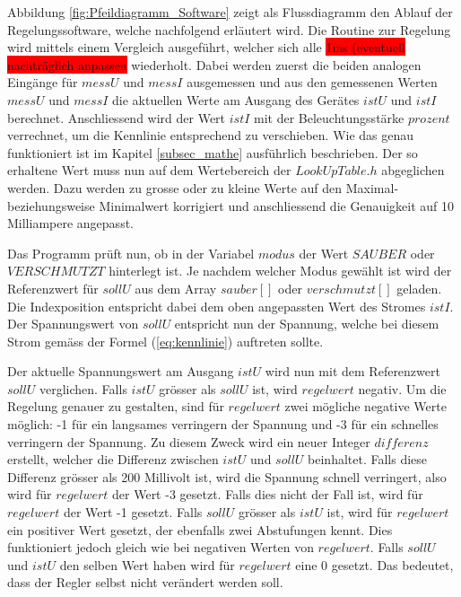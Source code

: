 Abbildung \ref{fig:Pfeildiagramm_Software} zeigt als Flussdiagramm den Ablauf der Regelungssoftware, welche nachfolgend erläutert wird. Die Routine zur Regelung wird mittels einem Vergleich ausgeführt, welcher sich alle \colorbox{red}{1ms (eventuell nachträglich anpassen} wiederholt. Dabei werden zuerst die beiden analogen Eingänge für $messU$ und $messI$ ausgemessen und aus den gemessenen Werten $messU$ und $messI$ die aktuellen Werte am Ausgang des Gerätes $istU$ und $istI$ berechnet. \newline
Anschliessend wird der Wert $istI$ mit der Beleuchtungsstärke $prozent$ verrechnet, um die Kennlinie entsprechend zu verschieben. Wie das genau funktioniert ist im Kapitel \ref{subsec_mathe} ausführlich beschrieben. \newline
Der so erhaltene Wert muss nun auf dem Wertebereich der $LookUpTable.h$ abgeglichen werden. Dazu werden zu grosse oder zu kleine Werte auf den Maximal- beziehungsweise Minimalwert korrigiert und anschliessend die Genauigkeit auf 10 Milliampere angepasst.

Das Programm prüft nun, ob in der Variabel $modus$ der Wert $SAUBER$ oder $VERSCHMUTZT$ hinterlegt ist. Je nachdem welcher Modus gewählt ist wird der Referenzwert für $sollU$ aus dem Array $sauber[]$ oder $verschmutzt[]$ geladen. Die Indexposition entspricht dabei dem oben angepassten Wert des Stromes $istI$. Der Spannungswert von $sollU$ entspricht nun der Spannung, welche bei diesem Strom gemäss der Formel (\ref{eq:kennlinie}) auftreten sollte.

Der aktuelle Spannungswert am Ausgang $istU$ wird nun mit dem Referenzwert $sollU$ verglichen. Falls $istU$ grösser als $sollU$ ist, wird $regelwert$ negativ. Um die Regelung genauer zu gestalten, sind für $regelwert$ zwei mögliche negative Werte möglich: -1 für ein langsames verringern der Spannung und -3 für ein schnelles verringern der Spannung. Zu diesem Zweck wird ein neuer Integer $differenz$ erstellt, welcher die Differenz zwischen $istU$ und $sollU$ beinhaltet. Falls diese Differenz grösser als 200 Millivolt ist, wird die Spannung schnell verringert, also wird für $regelwert$ der Wert -3 gesetzt. Falls dies nicht der Fall ist, wird für $regelwert$ der Wert -1 gesetzt. \newline
Falls $sollU$ grösser als $istU$ ist, wird für $regelwert$ ein positiver Wert gesetzt, der ebenfalls zwei Abstufungen kennt. Dies funktioniert jedoch gleich wie bei negativen Werten von $regelwert$. \newline
Falls $sollU$ und $istU$ den selben Wert haben wird für $regelwert$ eine 0 gesetzt. Das bedeutet, dass der Regler selbst nicht verändert werden soll.


